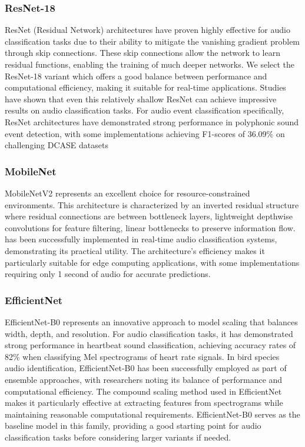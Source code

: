 \documentclass[11pt]{article}
\begin{document}
\subsubsection{ResNet-18}
ResNet (Residual Network) architectures have proven highly effective for audio classification tasks due to their ability to mitigate the vanishing gradient problem through skip connections. These skip connections allow the network to learn residual functions, enabling the training of much deeper networks. We select the ResNet-18 variant which offers a good balance between performance and computational efficiency, making it suitable for real-time applications. Studies have shown that even this relatively shallow ResNet can achieve impressive results on audio classification tasks.
For audio event classification specifically, ResNet architectures have demonstrated strong performance in polyphonic sound event detection, with some implementations achieving F1-scores of 36.09\% on challenging DCASE datasets
\subsubsection{MobileNet}
MobileNetV2 represents an excellent choice for resource-constrained environments. This architecture is characterized by an inverted residual structure where residual connections are between bottleneck layers, lightweight depthwise convolutions for feature filtering, linear bottlenecks to preserve information flow. has been successfully implemented in real-time audio classification systems, demonstrating its practical utility. The architecture's efficiency makes it particularly suitable for edge computing applications, with some implementations requiring only 1 second of audio for accurate predictions.
\subsubsection{EfficientNet}
EfficientNet-B0 represents an innovative approach to model scaling that balances width, depth, and resolution. For audio classification tasks, it has demonstrated strong performance in heartbeat sound classification, achieving accuracy rates of 82\% when classifying Mel spectrograms of heart rate signals. In bird species audio identification, EfficientNet-B0 has been successfully employed as part of ensemble approaches, with researchers noting its balance of performance and computational efficiency. The compound scaling method used in EfficientNet makes it particularly effective at extracting features from spectrograms while maintaining reasonable computational requirements. EfficientNet-B0 serves as the baseline model in this family, providing a good starting point for audio classification tasks before considering larger variants if needed.
\end{document}
